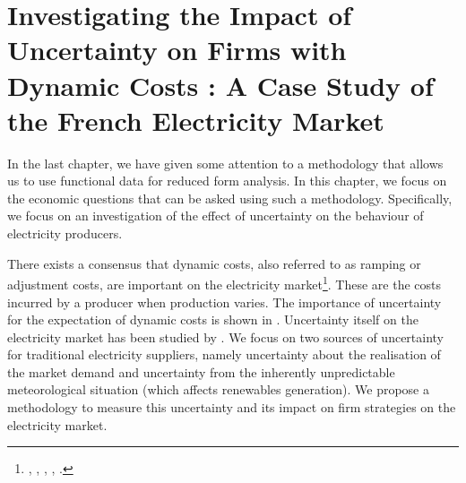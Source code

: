 

\renewcommand{\thesection}{\arabic{chapter}.\arabic{section}}


\chapter{Investigating the Impact of Uncertainty on Firms with Dynamic Costs : A Case Study of the French Electricity Market}
\label{chap:ch2}
\cleardoublepage

\doublespacing
In the last chapter, we have given some attention to a methodology that allows us to use functional data for reduced form analysis. In this chapter, we focus on the economic questions that can be asked using such a methodology. Specifically, we focus on an investigation of the effect of uncertainty on the behaviour of electricity producers. 

There exists a consensus that dynamic costs, also referred to as ramping or adjustment costs, are important on the electricity market\footnote{ \cite{anderson2005supply},  \cite{hobbs2001next}, \cite{hortacsu2008understanding}, \cite{reguant2011welfare}, \cite{sewalt2003negative}. }. These are the costs incurred by a producer when production varies. 
The importance of uncertainty for the expectation of dynamic costs is shown in \cite{bergesmartimort2014}. Uncertainty itself on the electricity market has been studied by \cite{wolak2007quantifying}. %
We focus on two sources of uncertainty for traditional electricity suppliers, namely uncertainty about the realisation of the market demand and uncertainty from the inherently unpredictable meteorological situation
(which affects renewables generation). 
We propose a methodology to measure this uncertainty and its impact on firm strategies on the electricity market. %

